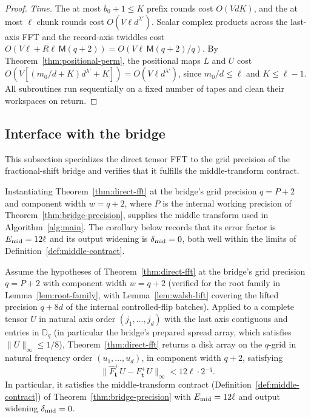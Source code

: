 \begin{proof}
\emph{Time.} The at most $b_0+1\le K$ prefix rounds cost $O(VdK)$, and the at most $\ell$ chunk rounds cost
$O(V\ell d^{\lambda'})$. Scalar complex products across the last-axis FFT and the record-axis twiddles cost
$O(V\ell+R\ell\,\mathsf M(q+2))=O(V\ell\,\mathsf M(q+2)/q)$. By Theorem~\ref{thm:positional-perm}, the positional maps
$L$ and $U$ cost $O(V[(m_0/d+K)d^{\lambda'}+K])=O(V\ell d^{\lambda'})$, since $m_0/d\le\ell$ and $K\le\ell-1$. All
subroutines run sequentially on a fixed number of tapes and clean their workspaces on return.
\end{proof}

\subsection{Interface with the bridge}\label{sec:direct-fft-bridge}

This subsection specializes the direct tensor FFT to the grid precision of the fractional-shift bridge and verifies that
it fulfills the middle-transform contract.

Instantiating Theorem~\ref{thm:direct-fft} at the bridge's grid precision $q=P+2$ and component width $w=q+2$, where $P$
is the internal working precision of Theorem~\ref{thm:bridge-precision}, supplies the middle transform used in
Algorithm~\ref{alg:main}. The corollary below records that its error factor is $E_{\rm mid}=12\ell$ and its output widening is
$\delta_{\rm mid}=0$, both well within the limits of Definition~\ref{def:middle-contract}.

\begin{corollary}\label{cor:walsh-middle}
Assume the hypotheses of Theorem~\ref{thm:direct-fft} at the bridge's grid precision $q=P+2$ with component width
$w=q+2$ (verified for the root family in Lemma~\ref{lem:root-family}, with Lemma~\ref{lem:walsh-lift} covering the
lifted precision $q+8d$ of the internal controlled-flip batches). Applied to a complete tensor $U$ in natural axis order
$(j_1,\dots,j_d)$ with the last axis contiguous and entries in $\mathbb D_q$ (in particular the bridge's prepared spread
array, which satisfies $\|U\|_\infty\le1/8$), Theorem~\ref{thm:direct-fft} returns a disk array on the $q$-grid in
natural frequency order $(u_1,\dots,u_d)$, in component width $q+2$, satisfying
\begin{equation}\label{eq:walsh-middle-error}
  \|\widehat F^+_{\mathbf t}U-F^+_{\mathbf t}U\|_\infty<12\ell\cdot2^{-q}.
\end{equation}
In particular, it satisfies the middle-transform contract (Definition~\ref{def:middle-contract}) of
Theorem~\ref{thm:bridge-precision} with $E_{\rm mid}=12\ell$ and output widening $\delta_{\rm mid}=0$.
\end{corollary}


